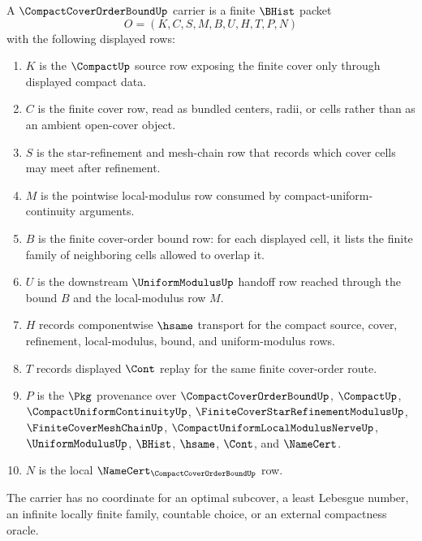 \begin{definition}
\label{def:compact-cover-order-bound-carrier}
A $\CompactCoverOrderBoundUp$ carrier is a finite $\BHist$ packet
$$
O=(K,C,S,M,B,U,H,T,P,N)
$$
with the following displayed rows:
\begin{enumerate}
\item $K$ is the $\CompactUp$ source row exposing the finite cover only through displayed compact data.
\item $C$ is the finite cover row, read as bundled centers, radii, or cells rather than as an ambient open-cover object.
\item $S$ is the star-refinement and mesh-chain row that records which cover cells may meet after refinement.
\item $M$ is the pointwise local-modulus row consumed by compact-uniform-continuity arguments.
\item $B$ is the finite cover-order bound row: for each displayed cell, it lists the finite family of neighboring cells allowed to overlap it.
\item $U$ is the downstream $\UniformModulusUp$ handoff row reached through the bound $B$ and the local-modulus row $M$.
\item $H$ records componentwise $\hsame$ transport for the compact source, cover, refinement, local-modulus, bound, and uniform-modulus rows.
\item $T$ records displayed $\Cont$ replay for the same finite cover-order route.
\item $P$ is the $\Pkg$ provenance over $\CompactCoverOrderBoundUp$, $\CompactUp$, $\CompactUniformContinuityUp$, $\FiniteCoverStarRefinementModulusUp$, $\FiniteCoverMeshChainUp$, $\CompactUniformLocalModulusNerveUp$, $\UniformModulusUp$, $\BHist$, $\hsame$, $\Cont$, and $\NameCert$.
\item $N$ is the local $\NameCert_{\CompactCoverOrderBoundUp}$ row.
\end{enumerate}
The carrier has no coordinate for an optimal subcover, a least Lebesgue number, an infinite locally finite family, countable choice, or an external compactness oracle.
\end{definition}

